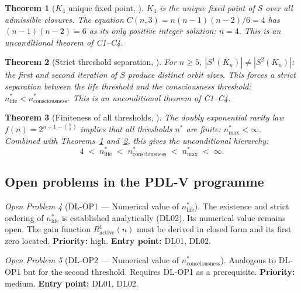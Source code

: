 \documentclass[11pt,a4paper]{article}
\theoremstyle{plain}
\newtheorem{theorem}{Theorem}[section]
\theoremstyle{definition}
\theoremstyle{remark}
\newtheorem{openproblem}[theorem]{Open Problem}
\begin{document}
\begin{theorem}[$K_4$ unique fixed point, \cite{DL02}]
\label{thm:DL02_unique}
$K_4$ is the unique fixed point of $S$ over all admissible closures. The equation $C(n,3) = n(n-1)(n-2)/6 = 4$ has $(n-1)(n-2) = 6$ as its only positive integer solution: $n = 4$. This is an unconditional theorem of C1--C4.
\end{theorem}

\begin{theorem}[Strict threshold separation, \cite{DL02}]
\label{thm:DL02_separation}
For $n \geq 5$, $|S^1(K_n)| \neq |S^2(K_n)|$: the first and second iteration of $S$ produce distinct orbit sizes. This forces a strict separation between the life threshold and the consciousness threshold: $n^*_{\mathrm{life}} < n^*_{\mathrm{consciousness}}$. This is an unconditional theorem of C1--C4.
\end{theorem}

\begin{theorem}[Finiteness of all thresholds, \cite{DL02}]
\label{thm:DL02_finiteness}
The doubly exponential rarity law $f(n) = 2^{n+1-\binom{n}{2}}$ implies that all thresholds $n^*$ are finite: $n^*_{\mathrm{max}} < \infty$. Combined with Theorems~\ref{thm:DL02_unique} and~\ref{thm:DL02_separation}, this gives the unconditional hierarchy:
\begin{equation}
4 \;<\; n^*_{\mathrm{life}} \;<\; n^*_{\mathrm{consciousness}} \;<\; n^*_{\mathrm{max}} \;<\; \infty.
\end{equation}
\end{theorem}

\subsection{Open problems in the PDL-V programme}

\begin{openproblem}[DL-OP1 --- Numerical value of $n^*_{\mathrm{life}}$]
\label{op:DL_nlife}
The existence and strict ordering of $n^*_{\mathrm{life}}$ is established analytically (DL02). Its numerical value remains open. The gain function $R^1_{\mathrm{active}}(n)$ must be derived in closed form and its first zero located. \textbf{Priority:} high. \textbf{Entry point:} DL01, DL02.
\end{openproblem}

\begin{openproblem}[DL-OP2 --- Numerical value of $n^*_{\mathrm{consciousness}}$]
\label{op:DL_nconsciousness}
Analogous to DL-OP1 but for the second threshold. Requires DL-OP1 as a prerequisite. \textbf{Priority:} medium. \textbf{Entry point:} DL01, DL02.
\end{openproblem}
\end{document}
